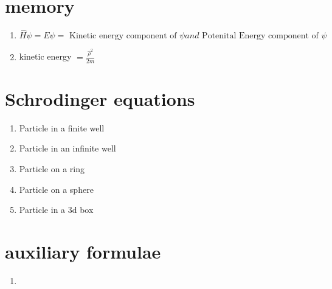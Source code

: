 \documentclass{article}
\begin{document}
\section{memory}
\begin{enumerate}
    \item $\hat{H} \psi = E \psi = \text{ Kinetic energy component of } \psi and \text{ Potenital Energy component of } \psi$
    \item kinetic energy $ = \frac{\hat{\rho}^2}{2m} $
\end{enumerate}
\section{Schrodinger equations}
\begin{enumerate}
    \item Particle in a finite well
    \item Particle in an infinite well
    \item Particle on a ring
    \item Particle on a sphere
    \item Particle in a 3d box
\end{enumerate}

\section{auxiliary formulae}
\begin{enumerate}
    \item 
\end{enumerate}
\end{document}

